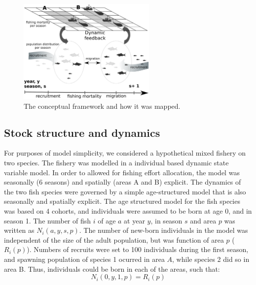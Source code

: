 \documentclass[12pt,oneline,a4paper,numbib]{ouparticle}
\numberwithin{equation}{subsection} %
\begin{document}
\begin{figure}[!h]
\centering
\includegraphics[width=0.6\textwidth]{Figures/Areadynamics.eps} 
\caption{The conceptual framework and how it was mapped.}
\label{fig:MSE}
\end{figure}

\subsection{Stock structure and dynamics}
\label{sec2.1}

For purposes of model simplicity, we considered a hypothetical mixed fishery on two species. The fishery was modelled in a individual based dynamic state variable model. In order to allowed for fishing effort allocation, the model was seasonally (6 seasons) and spatially (areas A and B) explicit. The dynamics of the two fish species were governed by a simple age-structured model that is also seasonally and spatially explicit. The age structured model for the fish species was based on 4 cohorts, and individuals were assumed to be born at age 0, and in season 1. The number of fish $i$ of age $a$ at year $y$, in season $s$ and area $p$ was written as $N_i (a, y, s, p)$. The number of new-born individuals in the model was independent of the size of the adult population, but was function of area $p$ ($R_i (p)$). Numbers of recruits were set to 100 individuals during the first season, and spawning population of species 1 ocurred in area $A$, while species 2 did so in area B. Thus, individuals could be born in each of the areas, such that:  
\begin{equation}
N_i (0, y, 1, p) = R_i (p)
\end{equation}
\end{document}

